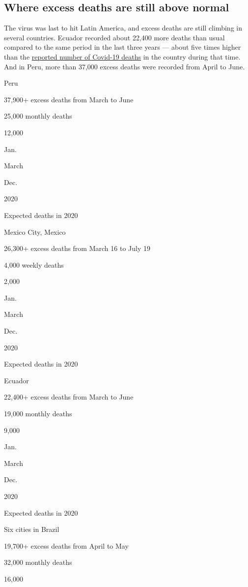 \hypertarget{where-excess-deaths-are-still-above-normal}{%
\subsection{Where excess deaths are still above
normal}\label{where-excess-deaths-are-still-above-normal}}

The virus was last to hit Latin America, and excess deaths are still
climbing in several countries. Ecuador recorded about 22,400 more deaths
than usual compared to the same period in the last three years --- about
five times higher than the
\href{https://www.nytimes.com/2020/04/23/world/americas/ecuador-deaths-coronavirus.html}{reported
number of Covid-19 deaths} in the country during that time. And in Peru,
more than 37,000 excess deaths were recorded from April to June.

Peru

37,900+ excess deaths from March to June

25,000 monthly deaths

12,000

Jan.

March

Dec.

2020

Expected deaths in 2020

Mexico City, Mexico

26,300+ excess deaths from March 16 to July 19

4,000 weekly deaths

2,000

Jan.

March

Dec.

2020

Expected deaths in 2020

Ecuador

22,400+ excess deaths from March to June

19,000 monthly deaths

9,000

Jan.

March

Dec.

2020

Expected deaths in 2020

Six cities in Brazil

19,700+ excess deaths from April to May

32,000 monthly deaths

16,000

